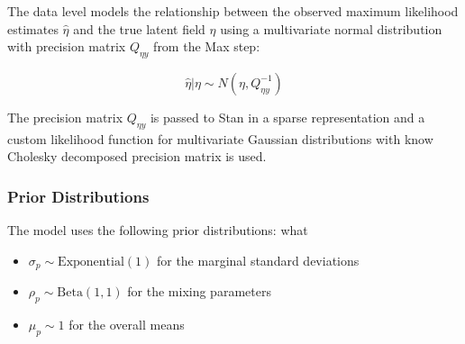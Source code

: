 \documentclass[
  letterpaper,
  DIV=11,
  numbers=noendperiod]{scrartcl}
\providecommand{\tightlist}{%
  \setlength{\itemsep}{0pt}\setlength{\parskip}{0pt}}\usepackage{longtable,booktabs,array}
\begin{document}
The data level models the relationship between the observed maximum
likelihood estimates \(\hat{\eta}\) and the true latent field \(\eta\)
using a multivariate normal distribution with precision matrix
\(Q_{\eta y}\) from the Max step:

\[\hat{\eta} | \eta \sim N(\eta, Q_{\eta y}^{-1})\]

The precision matrix \(Q_{\eta y}\) is passed to Stan in a sparse
representation and a custom likelihood function for multivariate
Gaussian distributions with know Cholesky decomposed precision matrix is
used.

\subsubsection{Prior Distributions}\label{prior-distributions}

The model uses the following prior distributions: what

\begin{itemize}
\tightlist
\item
  \(\sigma_p \sim \text{Exponential}(1)\) for the marginal standard
  deviations
\item
  \(\rho_p \sim \text{Beta}(1,1)\) for the mixing parameters
\item
  \(\mu_p \sim 1\) for the overall means
\end{itemize}
\end{document}
